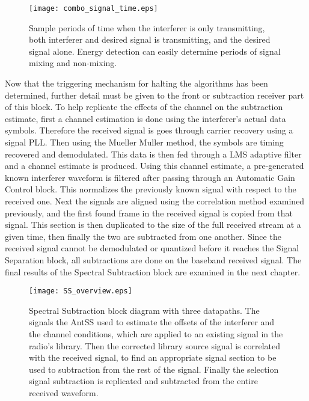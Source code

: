 \begin{figure}[!ht]
\centering
\texttt{[image: combo\_signal\_time.eps]}
\caption{Sample periods of time when the interferer is only transmitting, both interferer and desired signal is transmitting, and the desired signal alone.  Energy detection can easily determine periods of signal mixing and non-mixing.}
\label{fig:combo_signal_time}
\end{figure}


Now that the triggering mechanism for halting the algorithms has been determined, further detail must be given to the front or subtraction receiver part of this block.  To help replicate the effects of the channel on the subtraction estimate, first a channel estimation is done using the interferer's actual data symbols.  Therefore the received signal is goes through carrier recovery using a signal PLL.  Then using the Mueller Muller method, the symbols are timing recovered and demodulated.  This data is then fed through a LMS adaptive filter and a channel estimate is produced.  Using this channel estimate, a pre-generated known interferer waveform is filtered after passing through an Automatic Gain Control block. This normalizes the previously known signal with respect to the received one.  Next the signals are aligned using the correlation method examined previously, and the first found frame in the received signal is copied from that signal.  This section is then duplicated to the size of the full received stream at a given time, then finally the two are subtracted from one another.  Since the received signal cannot be demodulated or quantized before it reaches the Signal Separation block, all subtractions are done on the baseband received signal.  The final results of the Spectral Subtraction block are examined in the next chapter.\\

\begin{figure}[!ht]
\centering
\texttt{[image: SS\_overview.eps]}
\caption{Spectral Subtraction block diagram with three datapaths.  The signals the AntSS used to estimate the offsets of the interferer and the channel conditions, which are applied to an existing signal in the radio's library.  Then the corrected library source signal is correlated with the received signal, to find an appropriate signal section to be used to subtraction from the rest of the signal.  Finally the selection signal subtraction is replicated and subtracted from the entire received waveform.  }
\label{ss_overview}
\end{figure}


